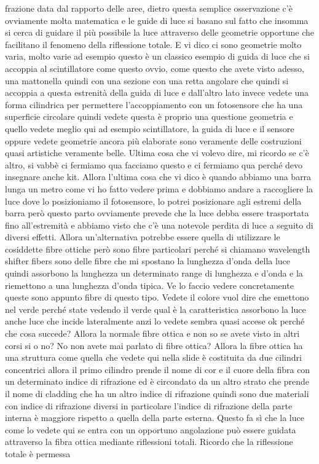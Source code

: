 {frazione data dal rapporto delle aree, dietro questa semplice osservazione c'è ovviamente molta matematica e le guide di luce si basano sul fatto che insomma si cerca di guidare il più possibile la luce attraverso delle geometrie opportune che facilitano il fenomeno della riflessione totale. E vi dico ci sono geometrie molto varia, molto varie ad esempio questo è un classico esempio di guida di luce che si accoppia al scintillatore come questo ovvio, come questo che avete visto adesso, una mattonella quindi con una sezione con una retta angolare che quindi si accoppia a questa estrenità della guida di luce e dall'altro lato invece vedete una forma cilindrica per permettere l'accoppiamento con un fotosensore che ha una superficie circolare quindi vedete questa è proprio una questione geometria e quello vedete meglio qui ad esempio scintillatore, la guida di luce e il sensore oppure vedete geometrie ancora più elaborate sono veramente delle costruzioni quasi artistiche veramente belle. Ultima cosa che vi volevo dire, mi ricordo se c'è altro, si vabbè ci fermiamo qua facciamo questo e ci fermiamo qua perché devo insegnare anche kit. Allora l'ultima cosa che vi dico è quando abbiamo una barra lunga un metro come vi ho fatto vedere prima e dobbiamo andare a raccogliere la luce dove lo posizioniamo il fotosensore, lo potrei posizionare agli estremi della barra però questo parto ovviamente prevede che la luce debba essere trasportata fino all'estremità e abbiamo visto che c'è una notevole perdita di luce a seguito di diversi effetti. Allora un'alternativa potrebbe essere quella di utilizzare le cosiddette fibre ottiche però sono fibre particolari perché si chiamano wavelength shifter fibers sono delle fibre che mi spostano la lunghezza d'onda della luce quindi assorbono la lunghezza un determinato range di lunghezza e d'onda e la riemettono a una lunghezza d'onda tipica. Ve lo faccio vedere concretamente queste sono appunto fibre di questo tipo. Vedete il colore vuol dire che emettono nel verde perché state vedendo il verde qual è la caratteristica assorbono la luce anche luce che incide lateralmente anzi lo vedete sembra quasi accese ok perché che cosa succede? Allora la normale fibre ottica e non so se avete visto in altri corsi si o no? No non avete mai parlato di fibre ottica? Allora la fibre ottica ha una struttura come quella che vedete qui nella slide è costituita da due cilindri concentrici allora il primo cilindro prende il nome di cor e il cuore della fibra con un determinato indice di rifrazione ed è circondato da un altro strato che prende il nome di cladding che ha un altro indice di rifrazione quindi sono due materiali con indice di rifrazione diversi in particolare l'indice di rifrazione della parte interna è maggiore rispetto a quella della parte esterna. Questo fa sì che la luce come lo vedete qui se entra con un opportuno angolazione può essere guidata attraverso la fibra ottica mediante riflessioni totali. Ricordo che la riflessione totale è permessa 

}
